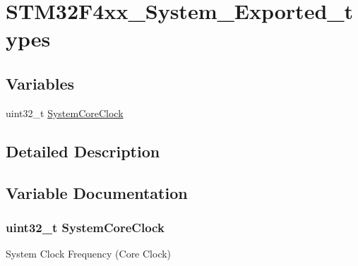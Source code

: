 \hypertarget{group___s_t_m32_f4xx___system___exported__types}{}\section{S\+T\+M32\+F4xx\+\_\+\+System\+\_\+\+Exported\+\_\+types}
\label{group___s_t_m32_f4xx___system___exported__types}
\subsection*{Variables}
\begin{DoxyCompactItemize}
\item 
uint32\+\_\+t \hyperlink{group___s_t_m32_f4xx___system___exported__types_gaa3cd3e43291e81e795d642b79b6088e6}{System\+Core\+Clock}
\end{DoxyCompactItemize}


\subsection{Detailed Description}


\subsection{Variable Documentation}
\subsubsection[{\texorpdfstring{System\+Core\+Clock}{SystemCoreClock}}]{\setlength{\rightskip}{0pt plus 5cm}uint32\+\_\+t System\+Core\+Clock}\hypertarget{group___s_t_m32_f4xx___system___exported__types_gaa3cd3e43291e81e795d642b79b6088e6}{}\label{group___s_t_m32_f4xx___system___exported__types_gaa3cd3e43291e81e795d642b79b6088e6}
System Clock Frequency (Core Clock) 